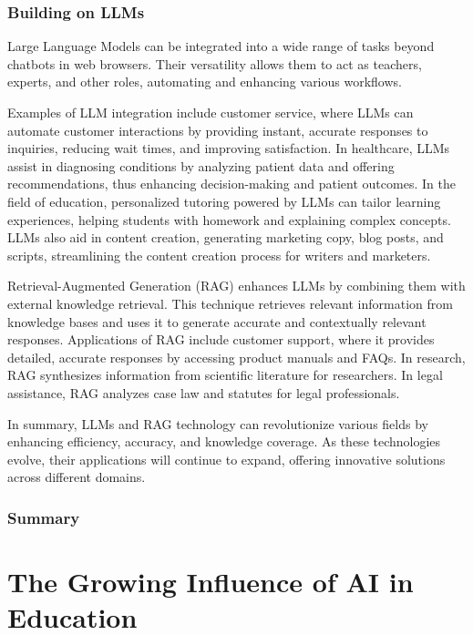 \documentclass{article}
\begin{document}
\subsubsection{Building on LLMs}

Large Language Models can be integrated into a wide range of
tasks beyond chatbots in web browsers. Their versatility allows
them to act as teachers, experts, and other roles, automating
and enhancing various workflows.

Examples of LLM integration include customer service,
where LLMs can automate customer interactions by providing instant, accurate responses to inquiries,
reducing wait times, and improving satisfaction. In healthcare, LLMs assist
in diagnosing conditions by analyzing patient data and offering
recommendations, thus enhancing decision-making and patient outcomes.
In the field of education, personalized tutoring powered by LLMs
can tailor learning experiences, helping students
with homework and explaining complex concepts. LLMs also aid
in content creation, generating marketing copy, blog posts,
and scripts, streamlining the content creation process for
writers and marketers.

Retrieval-Augmented Generation (RAG) enhances LLMs by combining
them with external knowledge retrieval. This technique retrieves relevant
information from knowledge bases and uses it to generate accurate
and contextually relevant responses. Applications of RAG include
customer support, where it provides detailed, accurate responses
by accessing product manuals and FAQs. In research, RAG synthesizes
information from scientific literature for researchers.
In legal assistance, RAG analyzes case law and statutes
for legal professionals. \cite{gao2024retrievalaugmented}

In summary, LLMs and RAG technology can revolutionize various fields by enhancing efficiency, accuracy, and knowledge coverage. As these technologies evolve, their applications will continue to expand, offering innovative solutions across different domains.



\subsubsection{Summary}%


\newpage
\section{The Growing Influence of AI in Education}
\end{document}
